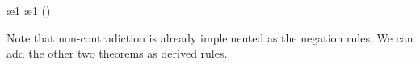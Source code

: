 \begin{table}
  \label{proof:dne}
  \begin{fitchproof}
    \open
     {\ephi\eand\enot\ephi}        
     {\ephi}                       \ae{1}
     {\enot\ephi}                  \ae{1}
     {\ebot}                       
    \close
     {\enot(\ephi\eand\enot\ephi)} 
  \end{fitchproof}
  \caption{Proof of \textbf{LNC}}
\end{table}

\begin{table}
  \label{proof:dne}
  \begin{fitchproof}
    \open
     {\enot\enot\ephi} 
    \open
     {\enot\ephi}      
     {\ebot}           
    \close
     {\ephi}           
    \close
    \open
     {\ephi}           
    \open
     {\enot\ephi}      
     {\ebot}           
    \close
     {\enot\enot\ephi} 
    \close
     {\ephi\eiff\enot\enot\ephi} 
  \end{fitchproof}
  \caption{Proof of \textbf{DNE}}
\end{table}

Note that non-contradiction is already implemented as the negation rules. We can
add the other two theorems as derived rules.

\begin{fitchrule}
  \label{def:excluded-middle-rule}
  \leavevmode
  \vspace{-0.9\baselineskip}
  \begin{fitchproof}
    \open
     {\ephi}      
     {\epsi}
    \close
    \open
     {\enot\ephi} 
     {\epsi}
    \close
     {\epsi}      
  \end{fitchproof}    
\end{fitchrule}

\begin{fitchrule}
  \label{def:double-negative-rule}
  \leavevmode
  \vspace{-0.9\baselineskip}
  \begin{fitchproof}
     {\enot\enot\ephi}
     {\ephi} 
  \end{fitchproof}
\end{fitchrule}

